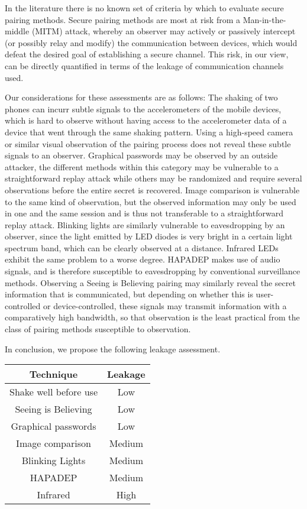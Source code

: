 \documentclass[conference, 11pt]{sty/IEEEtran}
\begin{document}
In the literature there is no known set of criteria by which to evaluate secure pairing methods.
Secure pairing methods are most at risk from a Man-in-the-middle (MITM) attack, whereby an observer may actively or passively intercept (or possibly relay and modify) the communication between devices, which would defeat the desired goal of establishing a secure channel.
This risk, in our view, can be directly quantified in terms of the leakage of communication channels used.

Our considerations for these assessments are as follows:
The shaking of two phones can incurr subtle signals to the accelerometers of the mobile devices, which is hard to observe without having access to the accelerometer data of a device that went through the same shaking pattern.
Using a high-speed camera or similar visual observation of the pairing process does not reveal these subtle signals to an observer.
Graphical passwords may be observed by an outside attacker, the different methods within this category may be vulnerable to a straightforward replay attack while others may be randomized and require several observations before the entire secret is recovered.
Image comparison is vulnerable to the same kind of observation, but the observed information may only be used in one and the same session and is thus not transferable to a straightforward replay attack.
Blinking lights are similarly vulnerable to eavesdropping by an observer, since the light emitted by LED diodes is very bright in a certain light spectrum band, which can be clearly observed at a distance.
Infrared LEDs exhibit the same problem to a worse degree.
HAPADEP makes use of audio signals, and is therefore susceptible to eavesdropping by conventional surveillance methods.
Observing a Seeing is Believing pairing may similarly reveal the secret information that is communicated, but depending on whether this is user-controlled or device-controlled, these signals may transmit information with a comparatively high bandwidth, so that observation is the least practical from the class of pairing methods susceptible to observation.

In conclusion, we propose the following leakage assessment.

\begin{tabular}{c|c}
	Technique & Leakage \\
	\hline
	Shake well before use & Low \\
	Seeing is Believing & Low \\
	Graphical passwords & Low \\
	Image comparison & Medium \\
     Blinking Lights & Medium \\
     HAPADEP & Medium \\
	Infrared & High \\
\end{tabular}
\end{document}
